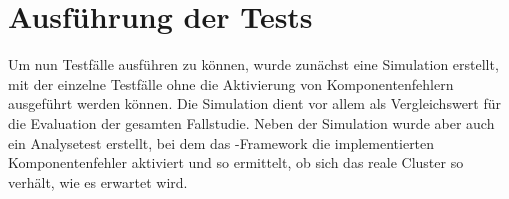\chapter{Ausführung der Tests}\label{chap:execution}

Um nun Testfälle ausführen zu können, wurde zunächst eine Simulation erstellt, mit der einzelne Testfälle ohne die Aktivierung von Komponentenfehlern ausgeführt werden können.
Die Simulation dient vor allem als Vergleichswert für die Evaluation der gesamten Fallstudie.
Neben der Simulation wurde aber auch ein Analysetest erstellt, bei dem das \sS-Framework die implementierten Komponentenfehler aktiviert und so ermittelt, ob sich das reale Cluster so verhält, wie es erwartet wird.





